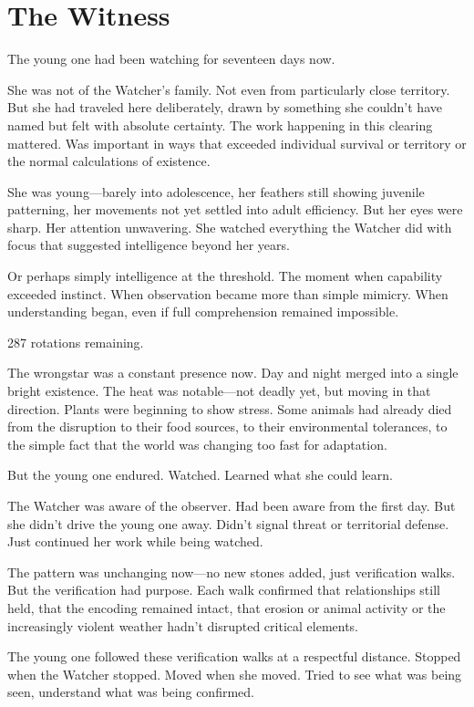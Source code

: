 \chapter{The Witness}
\label{ch:12}


The young one had been watching for seventeen days now.

She was not of the Watcher's family. Not even from particularly close territory. But she had traveled here deliberately, drawn by something she couldn't have named but felt with absolute certainty. The work happening in this clearing mattered. Was important in ways that exceeded individual survival or territory or the normal calculations of existence.

She was young—barely into adolescence, her feathers still showing juvenile patterning, her movements not yet settled into adult efficiency. But her eyes were sharp. Her attention unwavering. She watched everything the Watcher did with focus that suggested intelligence beyond her years.

Or perhaps simply intelligence at the threshold. The moment when capability exceeded instinct. When observation became more than simple mimicry. When understanding began, even if full comprehension remained impossible.

287 rotations remaining.

The wrongstar was a constant presence now. Day and night merged into a single bright existence. The heat was notable—not deadly yet, but moving in that direction. Plants were beginning to show stress. Some animals had already died from the disruption to their food sources, to their environmental tolerances, to the simple fact that the world was changing too fast for adaptation.

But the young one endured. Watched. Learned what she could learn.

\scenebreak

The Watcher was aware of the observer. Had been aware from the first day. But she didn't drive the young one away. Didn't signal threat or territorial defense. Just continued her work while being watched.

The pattern was unchanging now—no new stones added, just verification walks. But the verification had purpose. Each walk confirmed that relationships still held, that the encoding remained intact, that erosion or animal activity or the increasingly violent weather hadn't disrupted critical elements.

The young one followed these verification walks at a respectful distance. Stopped when the Watcher stopped. Moved when she moved. Tried to see what was being seen, understand what was being confirmed.

